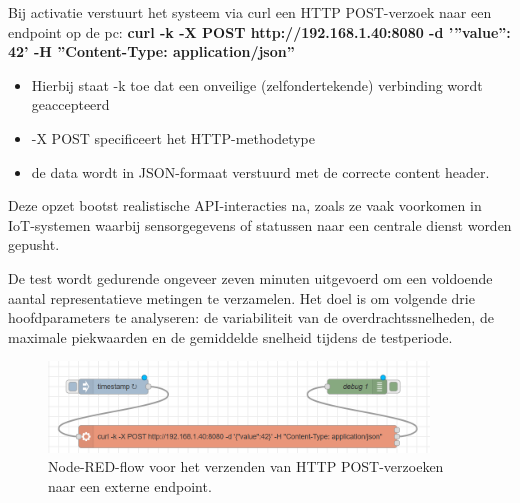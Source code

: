 Bij activatie verstuurt het systeem via curl een HTTP POST-verzoek naar een endpoint op de pc: \textbf{curl -k -X POST http://192.168.1.40:8080 -d ’”value”: 42’ -H ”Content-Type: application/json”}


\begin{itemize}
    \item Hierbij staat -k toe dat een onveilige (zelfondertekende) verbinding wordt geaccepteerd
    \item -X POST specificeert het HTTP-methodetype
    \item de data wordt in JSON-formaat verstuurd met de correcte content header.
\end{itemize}

Deze opzet bootst realistische API-interacties na, zoals ze vaak voorkomen in IoT-systemen waarbij sensorgegevens of statussen naar een centrale dienst worden gepusht.

De test wordt gedurende ongeveer zeven minuten uitgevoerd om een voldoende aantal representatieve metingen te verzamelen. Het doel is om volgende drie hoofdparameters te analyseren: de variabiliteit van de overdrachtssnelheden, de maximale piekwaarden en de gemiddelde snelheid tijdens de testperiode. 


\begin{figure}[h]
    \centering
    \includegraphics[width=0.9\textwidth]{../graphics/node-red_flow.png}
    \caption{Node-RED-flow voor het verzenden van HTTP POST-verzoeken naar een externe endpoint.}
    \label{fig:nodered-flow}
\end{figure}

